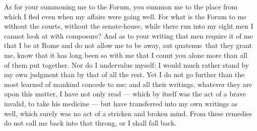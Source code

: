  As for your summoning me to the Forum, you summon me to the place from which I fled even when my affairs were going well. For what is the Forum to me without the courts, without the senate-house, while there run into my sight men I cannot look at with composure? And as to your writing that men require it of me that I be at Rome and do not allow me to be away, \dag aut quatenus\dag\ that they grant me, know that it has long been so with me that I count you alone more than all of them put together. Nor do I undervalue myself: I would much rather stand by my own judgment than by that of all the rest. Yet I do not go further than the most learned of mankind concede to me; and all their writings, whatever they are upon this matter, I have not only read --- which by itself was the act of a brave invalid, to take his medicine --- but have transferred into my own writings as well, which surely was no act of a stricken and broken mind. From these remedies do not call me back into that throng, or I shall fall back.
